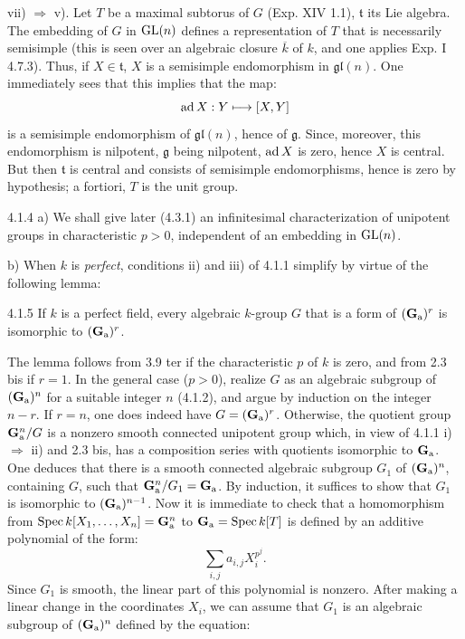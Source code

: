 \noindent vii) $\Rightarrow$ v). Let $T$ be a maximal subtorus of $G$ (Exp. XIV 1.1), $\mathfrak t$ its Lie algebra. The embedding of $G$ in $\operatorname{GL}(n)$ defines a representation of $T$ that is necessarily semisimple (this is seen over an algebraic closure $\overline k$ of $k$, and one applies Exp. I 4.7.3). Thus, if $X\in\mathfrak t$, $X$ is a semisimple endomorphism in $\mathfrak{gl}(n)$. One immediately sees that this implies that the map:
\[
 \operatorname{ad} X:Y\longmapsto[X,Y]
\]
is a semisimple endomorphism of $\mathfrak{gl}(n)$, hence of $\mathfrak g$. Since, moreover, this endomorphism is nilpotent, $\mathfrak g$ being nilpotent, $\operatorname{ad} X$ is zero, hence $X$ is central. But then $\mathfrak t$ is central and consists of semisimple endomorphisms, hence is zero by hypothesis; a fortiori, $T$ is the unit group.

\begin{remark}{4.1.4}\label{XVII.4.1.4}
\noindent a) We shall give later (4.3.1) an infinitesimal characterization of unipotent groups in characteristic $p>0$, independent of an embedding in $\operatorname{GL}(n)$.

\noindent b) When $k$ is \emph{perfect}, conditions ii) and iii) of 4.1.1 simplify by virtue of the following lemma:
\end{remark}
\begin{lemma}{4.1.5}\label{XVII.4.1.5}
If $k$ is a perfect field, every algebraic $k$-group $G$ that is a form of $(\mathbf{G}_{\mathrm{a}})^r$ is isomorphic to $(\mathbf{G}_{\mathrm{a}})^r$.
\end{lemma}
The lemma follows from 3.9 ter if the characteristic $p$ of $k$ is zero, and from 2.3 bis if $r=1$. In the general case ($p>0$), realize $G$ as an algebraic subgroup of $(\mathbf{G}_{\mathrm{a}})^n$ for a suitable integer $n$ (4.1.2), and argue by induction on the integer $n-r$. If $r=n$, one does indeed have $G=(\mathbf{G}_{\mathrm{a}})^r$. Otherwise, the quotient group $\mathbf{G}_{\mathrm{a}}^n/G$ is a nonzero smooth connected unipotent group which, in view of 4.1.1 i) $\Rightarrow$ ii) and 2.3 bis, has a composition series with quotients isomorphic to $\mathbf{G}_{\mathrm{a}}$. One deduces that there is a smooth connected algebraic subgroup $G_1$ of $(\mathbf{G}_{\mathrm{a}})^n$, containing $G$, such that $\mathbf{G}_{\mathrm{a}}^n/G_1=\mathbf{G}_{\mathrm{a}}$.
By induction, it suffices to show that $G_1$ is isomorphic to $(\mathbf{G}_{\mathrm{a}})^{n-1}$. Now it is immediate to check that a homomorphism from $\operatorname{Spec} k[X_1,\ldots,X_n]=\mathbf{G}_{\mathrm{a}}^n$ to $\mathbf{G}_{\mathrm{a}}=\operatorname{Spec} k[T]$ is defined by an additive polynomial of the form:
\[
 \sum_{i,j}a_{i,j}X_i^{p^j}.
\]
Since $G_1$ is smooth, the linear part of this polynomial is nonzero. After making a linear change in the coordinates $X_i$, we can assume that $G_1$ is an algebraic subgroup of $(\mathbf{G}_{\mathrm{a}})^n$ defined by the equation:
